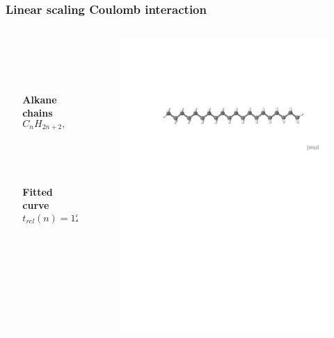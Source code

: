 \documentclass[mathserif, 8pt]{beamer}
\begin{document}
\begin{frame}
    \frametitle{Linear scaling Coulomb interaction}
    \begin{columns}
    \begin{column}{.10\textwidth}
    \ \\
    \end{column}
    \begin{column}{.40\textwidth}
	\centering
	\ \\
	\ \\
	\ \\
	\ \\
	\textbf{Alkane chains}
	\begin{equation}
	    \nonumber
	    C_{n}H_{2n+2}, \qquad n=2,\dots,70
	\end{equation}
	\ \\
	\ \\
	\ \\
	\ \\
	\textbf{Fitted curve}
	\begin{equation}
	    \nonumber
	    t_{rel}(n) = 12.5 + 2.34n^{0.754} 
	\end{equation}
    \end{column}
    \begin{column}{.50\textwidth}
	\centering
	\begin{figure}
	    \includegraphics[scale=0.3, clip, viewport = 80 560 600 720]{figures/alkane.pdf}

\end{figure}
\end{column}
\end{columns}
\end{frame}
\end{document}
